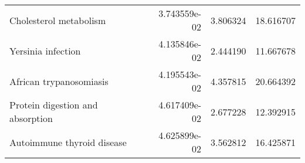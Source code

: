 \begin{tabular}{lrrr}
                            Cholesterol metabolism &      3.743559e-02 &  3.806324 &       18.616707 \\
                                Yersinia infection &      4.135846e-02 &  2.444190 &       11.667678 \\
                           African trypanosomiasis &      4.195543e-02 &  4.357815 &       20.664392 \\
                  Protein digestion and absorption &      4.617409e-02 &  2.677228 &       12.392915 \\
                        Autoimmune thyroid disease &      4.625899e-02 &  3.562812 &       16.425871 \\
\bottomrule
\end{tabular}
